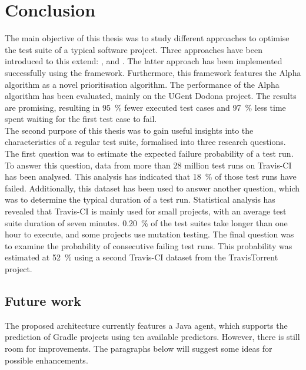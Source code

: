 
\chapter{Conclusion}
\label{ch:conclusion}

The main objective of this thesis was to study different approaches to optimise the test suite of a typical software project. Three approaches have been introduced to this extend: \tsm{}, \tcs{} and \tcp{}. The latter approach has been implemented successfully using the \velocity{} framework. Furthermore, this framework features the Alpha algorithm as a novel prioritisation algorithm. The performance of the Alpha algorithm has been evaluated, mainly on the UGent Dodona project. The results are promising, resulting in \SI{95}{\percent} fewer executed test cases and \SI{97}{\percent} less time spent waiting for the first test case to fail.\\

\noindent The second purpose of this thesis was to gain useful insights into the characteristics of a regular test suite, formalised into three research questions. The first question was to estimate the expected failure probability of a test run. To answer this question, data from more than 28 million test runs on Travis-CI has been analysed. This analysis has indicated that \SI{18}{\percent} of those test runs have failed. Additionally, this dataset has been used to answer another question, which was to determine the typical duration of a test run. Statistical analysis has revealed that Travis-CI is mainly used for small projects, with an average test suite duration of seven minutes. \SI{0.20}{\percent} of the test suites take longer than one hour to execute, and some projects use mutation testing. The final question was to examine the probability of consecutive failing test runs. This probability was estimated at \SI{52}{\percent} using a second Travis-CI dataset from the TravisTorrent project\cite{msr17challenge}.

\clearpage

\section{Future work}
The proposed architecture currently features a Java agent, which supports the prediction of Gradle projects using ten available predictors. However, there is still room for improvements. The paragraphs below will suggest some ideas for possible enhancements.

